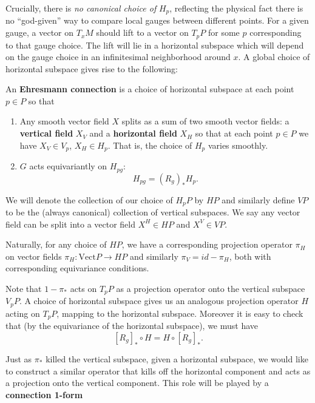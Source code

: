 		Crucially, there is \emph{no canonical choice of} $H_p$, reflecting the physical fact there is no ``god-given'' way to compare local gauges between different points. For a given gauge, a vector on $T_x M$ should lift to a vector on $T_p P$ for some $p$ corresponding to that gauge choice. The lift will lie in a horizontal subspace which will depend on the gauge choice in an infinitesimal neighborhood around $x$. A global choice of horizontal subspace gives rise to the following:
		\begin{defn}\label{def:ehresman}
		An \textbf{Ehresmann connection} is a choice of horizontal subspace at each point $p \in P$ so that
			\begin{enumerate}
				\item Any smooth vector field $X$ splits as a sum of two smooth vector fields: a \textbf{vertical field} $X_V$ and a \textbf{horizontal field} $X_H$ so that at each point $p \in P$ we have $X_V \in V_p$, $X_H \in H_p$. That is, the choice of $H_p$ varies smoothly.
				\item $G$ acts equivariantly on $H_{pg}$:
				\[
					H_{pg} = (R_{g})_* H_p.
				\]
			\end{enumerate}
		\end{defn}
	
		We will denote the collection of our choice of $H_p P$ by $HP$ and similarly define $VP$ to be the (always canonical) collection of vertical subspaces. We say any vector field can be split into a vector field $X^H \in HP$ and $X^V \in VP$.
	
		Naturally, for any choice of $HP$, we have a corresponding projection operator $\pi_H$ on vector fields $\pi_H: \mathrm{Vect}P \rightarrow HP$  and similarly $\pi_V = id - \pi_H$, both with corresponding equivariance conditions.
		
		Note that $1 - \pi_*$ acts on $T_p P$ as a projection operator onto the vertical subspace $V_p P$. A choice of horizontal subspace gives us an analogous projection operator $H$ acting on $T_p P$, mapping to the horizontal subspace. Moreover it is easy to check that (by the equivariance of the horizontal subspace), we must have
		\[
			[R_g]_* \circ H = H \circ [R_g]_*.
		\]
		
		Just as $\pi_*$ killed the vertical subspace, given a horizontal subspace, we would like to construct a similar operator that kills off the horizontal component and acts as a projection onto the vertical component. This role will be played by a \textbf{connection 1-form}

